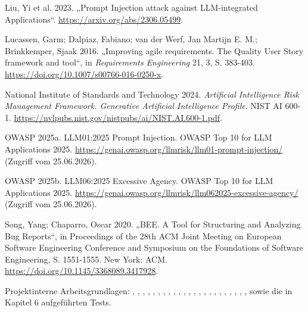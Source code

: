 Liu, Yi et al. 2023. „Prompt Injection attack against LLM-integrated Applications“. \url{https://arxiv.org/abs/2306.05499}.

Lucassen, Garm; Dalpiaz, Fabiano; van der Werf, Jan Martijn E. M.; Brinkkemper, Sjaak 2016. „Improving agile requirements. The Quality User Story framework and tool“, in \emph{Requirements Engineering} 21, 3, S. 383-403. \url{https://doi.org/10.1007/s00766-016-0250-x}.

National Institute of Standards and Technology 2024. \emph{Artificial Intelligence Risk Management Framework. Generative Artificial Intelligence Profile}. NIST AI 600-1. \url{https://nvlpubs.nist.gov/nistpubs/ai/NIST.AI.600-1.pdf}.

OWASP 2025a. LLM01:2025 Prompt Injection. OWASP Top 10 for LLM Applications 2025. \url{https://genai.owasp.org/llmrisk/llm01-prompt-injection/} (Zugriff vom 25.06.2026).

OWASP 2025b. LLM06:2025 Excessive Agency. OWASP Top 10 for LLM Applications 2025. \url{https://genai.owasp.org/llmrisk/llm062025-excessive-agency/} (Zugriff vom 25.06.2026).

Song, Yang; Chaparro, Oscar 2020. „BEE. A Tool for Structuring and Analyzing Bug Reports“, in Proceedings of the 28th ACM Joint Meeting on European Software Engineering Conference and Symposium on the Foundations of Software Engineering, S. 1551-1555. New York: ACM. \url{https://doi.org/10.1145/3368089.3417928}.

Projektinterne Arbeitsgrundlagen: , , , , , , , , , , , , , , , , , , , , , , ,  sowie die in Kapitel 6 aufgeführten Tests.

